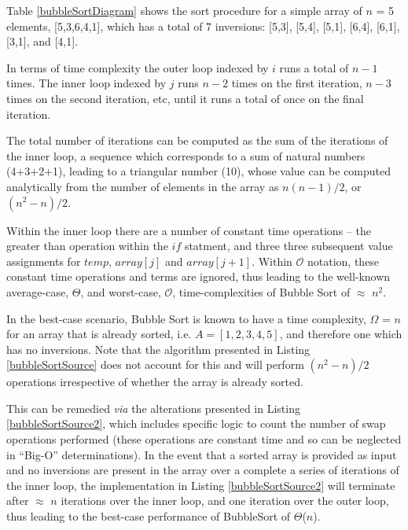 \documentclass[12pt,a4paper]{article}
\begin{document}
Table \ref{bubbleSortDiagram} shows the sort procedure for a simple array of $n$ = 5 elements, [5,3,6,4,1], which has a total of 7 inversions: [5,3], [5,4], [5,1], [6,4], [6,1], [3,1], and [4,1].

In terms of time complexity the outer loop indexed by $i$ runs a total of $n-1$ times. The inner loop indexed by $j$ runs $n-2$ times on the first iteration, $n-3$ times on the second iteration, etc, until it runs a total of once on the final iteration. 

The total number of iterations can be computed as the sum of the iterations of the inner loop, a sequence which corresponds to a sum of natural numbers (4+3+2+1), leading to a triangular number (10), whose value can be computed analytically from the number of elements in the array as $n(n-1)/2$, or $(n^2-n)/2$. 

Within the inner loop there are a number of constant time operations -- the greater than operation within the $if$ statment, and three three subsequent value assignments for $temp$, $array[j]$ and $array[j+1]$. Within $\mathcal{O}$ notation, these constant time operations and terms are ignored, thus leading to the well-known average-case, $\Theta$, and worst-case, $\mathcal{O}$, time-complexities of Bubble Sort of $\approx$ $n^2$. 

In the best-case scenario, Bubble Sort is known to have a time complexity, $\Omega$ = $n$ for an array that is already sorted, i.e. $A = [1,2,3,4,5]$, and therefore one which has no inversions. Note that the algorithm presented in Listing \ref{bubbleSortSource} does not account for this and will perform $(n^2-n)/2$ operations irrespective of whether the array is already sorted. 

This can be remedied \emph{via} the alterations presented in Listing \ref{bubbleSortSource2}, which includes specific logic to count the number of swap operations performed (these operations are constant time and so can be neglected in ``Big-O'' determinations). In the event that a sorted array is provided as input and no inversions are present in the array over a complete a series of iterations of the inner loop, the implementation in Listing \ref{bubbleSortSource2} will terminate after $\approx$ $n$ iterations over the inner loop, and one iteration over the outer loop, thus leading to the best-case performance of BubbleSort of $\Theta$($n$).
\end{document}
